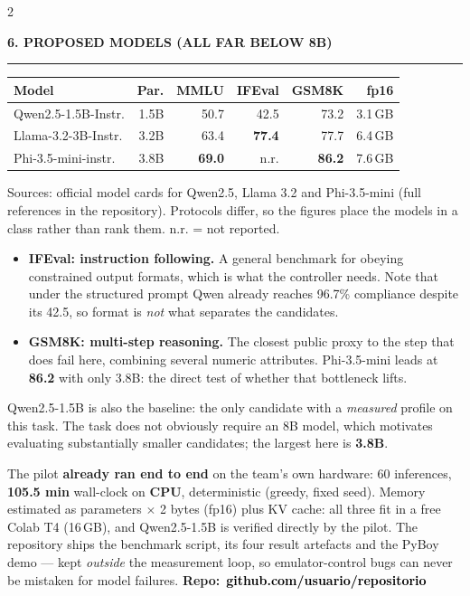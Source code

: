 \documentclass[9pt,a4paper]{extarticle}
\newcommand{\heading}[1]{%
  \par\vspace{1.4mm}\noindent
  {\color{navy}\bfseries\small\MakeUppercase{#1}}
  \par\vspace{0.7mm}\noindent
  {\color{amber}\rule{\linewidth}{1.1pt}}
  \par\vspace{0.6mm}\noindent\ignorespaces}
\newcommand{\ph}[1]{\colorbox{yellow!60}{\textcolor{black}{\textbf{#1}}}}
\begin{document}
\begin{multicols}{2}
\heading{6. Proposed models (all far below 8B)}
{\centering
\begin{tabular}{@{}lrrrrr@{}}
\toprule
\textbf{Model} & \textbf{Par.} & \textbf{MMLU} & \textbf{IFEval} & \textbf{GSM8K} & \textbf{fp16}\\
\midrule
Qwen2.5-1.5B-Instr. & 1.5B & 50.7 & 42.5 & 73.2 & 3.1\,GB\\
Llama-3.2-3B-Instr. & 3.2B & 63.4 & \textbf{77.4} & 77.7 & 6.4\,GB\\
Phi-3.5-mini-instr. & 3.8B & \textbf{69.0} & n.r. & \textbf{86.2} & 7.6\,GB\\
\bottomrule
\end{tabular}\par}
\vspace{0.3mm}
{\footnotesize Sources: official model cards for Qwen2.5, Llama 3.2 and Phi-3.5-mini (full references in the repository). Protocols differ, so the figures place the models in a class rather than rank them. n.r. = not reported.}
\vspace{0.6mm}

\begin{itemize}
\item \textbf{IFEval: instruction following.} A general benchmark for obeying constrained output formats, which is what the controller needs. Note that under the structured prompt Qwen already reaches 96.7\% compliance despite its 42.5, so format is \emph{not} what separates the candidates.
\item \textbf{GSM8K: multi-step reasoning.} The closest public proxy to the step that does fail here, combining several numeric attributes. Phi-3.5-mini leads at \textbf{86.2} with only 3.8B: the direct test of whether that bottleneck lifts.
\end{itemize}
Qwen2.5-1.5B is also the baseline: the only candidate with a \emph{measured} profile on this task. The task does not obviously require an 8B model, which motivates evaluating substantially smaller candidates; the largest here is \textbf{3.8B}.

\end{multicols}

\vspace{-2mm}
\begin{tcolorbox}[colback=paper,colframe=navy,boxrule=0.9pt,left=2.5mm,right=2.5mm,
                  top=1.4mm,bottom=1.4mm,arc=1mm,
                  fonttitle=\bfseries\footnotesize,coltitle=white,colbacktitle=navy,
                  title={7. EXECUTION FEASIBILITY \& REPRODUCIBILITY}]
\footnotesize
The pilot \textbf{already ran end to end} on the team's own hardware: 60 inferences, \textbf{105.5 min} wall-clock on \textbf{CPU}, deterministic (greedy, fixed seed). Memory estimated as parameters $\times$ 2 bytes (fp16) plus KV cache: all three fit in a free Colab T4 (16\,GB), and Qwen2.5-1.5B is verified directly by the pilot. The repository ships the benchmark script, its four result artefacts and the PyBoy demo --- kept \emph{outside} the measurement loop, so emulator-control bugs can never be mistaken for model failures. \hfill \mbox{\textbf{Repo:} \ph{github.com/usuario/repositorio}}
\end{tcolorbox}
\end{document}
